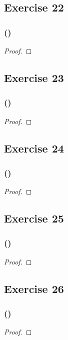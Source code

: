 \documentclass[14pt]{extarticle}
\begin{document}
\subsection{Exercise 22}

\subsubsection{()}

\begin{proof}

\end{proof}

\subsection{Exercise 23}

\subsubsection{()}

\begin{proof}

\end{proof}

\subsection{Exercise 24}

\subsubsection{()}

\begin{proof}

\end{proof}

\subsection{Exercise 25}

\subsubsection{()}

\begin{proof}

\end{proof}

\subsection{Exercise 26}

\subsubsection{()}

\begin{proof}

\end{proof}
\end{document}
